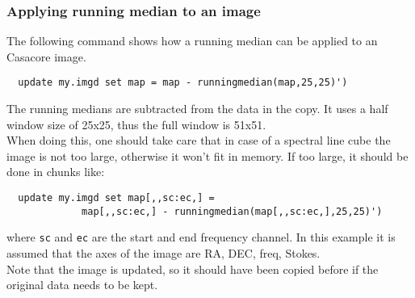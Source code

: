 \subsubsection{\label{TAQL:RUNEXAMPLES}Applying running median to an image}
The following command shows how a running median can 
be applied to an Casacore image.
\begin{verbatim}
  update my.imgd set map = map - runningmedian(map,25,25)')
\end{verbatim}
The running medians are
subtracted from the data in the copy. It uses a half window size 
of 25x25, thus the full window is 51x51.
\\When doing this, one should take care that in case of a spectral
line cube the image is not too large, otherwise it won't fit in
memory. If too large, it should be done in chunks like:
\begin{verbatim}
  update my.imgd set map[,,sc:ec,] =
             map[,,sc:ec,] - runningmedian(map[,,sc:ec,],25,25)')
\end{verbatim}
where \texttt{sc} and \texttt{ec} are the start and end frequency
channel.
In this example it is assumed that the axes of the image are RA, DEC,
freq, Stokes.
\\Note that the image is updated, so it should have been copied before
if the original data needs to be kept.

